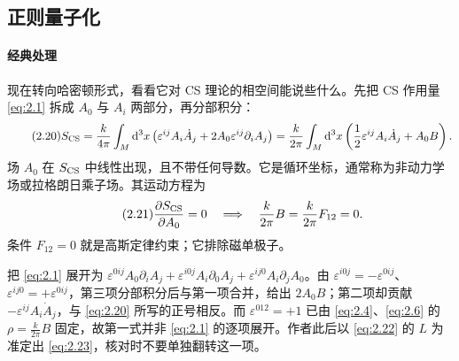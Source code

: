 

\subsection{正则量子化}\label{sec:2.3}

\paragraph{经典处理}现在转向哈密顿形式，看看它对 CS 理论的相空间能说些什么。先把 CS 作用量 \eqref{eq:2.1} 拆成 $A_0$ 与 $A_i$ 两部分，再分部积分：
\begin{equation}\tag{2.20}\label{eq:2.20}
  S_{\mathrm{CS}}
  = \frac{k}{4\pi}\int_M \mathrm{d}^3x\left(\varepsilon^{ij}A_i\dot A_j + 2A_0\varepsilon^{ij}\partial_iA_j\right)
  = \frac{k}{2\pi}\int_M \mathrm{d}^3x\left(\frac12\varepsilon^{ij}A_i\dot A_j + A_0B\right).
\end{equation}
场 $A_0$ 在 $S_{\mathrm{CS}}$ 中线性出现，且不带任何导数。它是循环坐标，通常称为非动力学场或拉格朗日乘子场。其运动方程为
\begin{equation}\tag{2.21}\label{eq:2.21}
  \frac{\partial S_{\mathrm{CS}}}{\partial A_0} = 0
  \quad\Longrightarrow\quad
  \frac{k}{2\pi}B = \frac{k}{2\pi}F_{12} = 0.
\end{equation}
条件 $F_{12}=0$ 就是高斯定律约束；它排除磁单极子。

\begin{yizhu}[易错点]
把 \eqref{eq:2.1} 展开为 $\varepsilon^{0ij}A_0\partial_iA_j+\varepsilon^{i0j}A_i\partial_0A_j+\varepsilon^{ij0}A_i\partial_jA_0$。由 $\varepsilon^{i0j}=-\varepsilon^{0ij}$、$\varepsilon^{ij0}=+\varepsilon^{0ij}$，第三项分部积分后与第一项合并，给出 $2A_0B$；第二项却贡献 $-\varepsilon^{ij}A_i\dot A_j$，与 \eqref{eq:2.20} 所写的正号相反。而 $\varepsilon^{012}=+1$ 已由 \eqref{eq:2.4}、\eqref{eq:2.6} 的 $\rho=\frac{k}{2\pi}B$ 固定，故第一式并非 \eqref{eq:2.1} 的逐项展开。作者此后以 \eqref{eq:2.22} 的 $L$ 为准定出 \eqref{eq:2.23}，核对时不要单独翻转这一项。
\end{yizhu}

